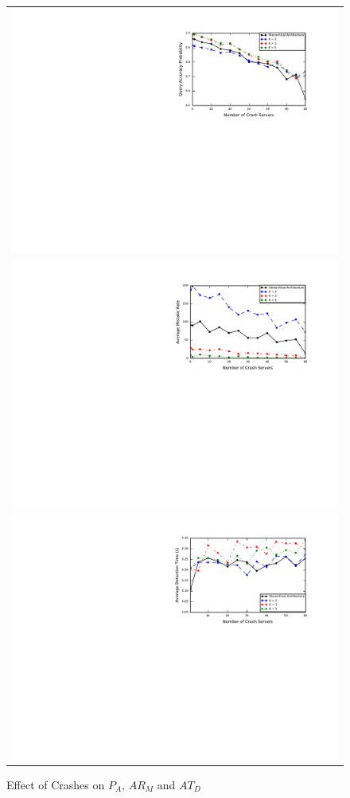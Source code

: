 \documentclass{sig-alternate-05-2015}
\begin{document}
\begin{figure}[t]
  \centering
  \begin{tabular}{c}
  \includegraphics[scale=0.7]{r3} \\
  \includegraphics[scale=0.7]{r4} \\
  \includegraphics[scale=0.7]{r5} \\
  \end{tabular}
  \caption{Effect of Crashes on $P_A$, $AR_M$ and $AT_D$}
\end{figure}
\end{document}
